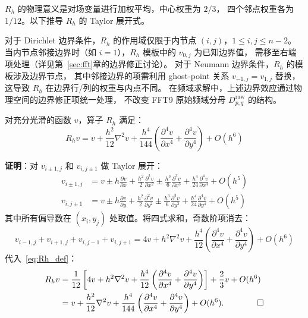 $R_h$ 的物理意义是对场变量进行加权平均，中心权重为 $2/3$，
四个邻点权重各为 $1/12$。以下推导 $R_h$ 的 Taylor 展开式。

\begin{remark}[$R_h$ 在边界附近的取值]
  \label{rem:Rh_boundary}
  对于 Dirichlet 边界条件，$R_h$ 的作用域仅限于内节点 $(i,j)$，$1 \leq i,j \leq n-2$。
  当内节点邻接边界时（如 $i=1$），$R_h$ 模板中的 $v_{0,j}$ 为已知边界值，
  需移至右端项处理（详见第~\ref{sec:fft}章的边界修正讨论）。
  对于 Neumann 边界条件，$R_h$ 的模板涉及边界节点，
  其中邻接边界的项需利用 ghost-point 关系 $v_{-1,j} = v_{1,j}$ 替换，
  这导致 $R_h$ 在边界行/列的权重与内点不同。
  在频域求解中，上述边界效应通过物理空间的边界修正项统一处理，
  不改变 FFT9 原始频域分母 $D_{p,q}^{\mathrm{raw}}$ 的结构。
\end{remark}

\begin{lemma}[$R_h$ 的 Taylor 展开]
  \label{lem:Rh_taylor}
  对充分光滑的函数 $v$，算子 $R_h$ 满足：
  \begin{equation}
    R_h v = v + \frac{h^2}{12}\nabla^2 v + \frac{h^4}{144}
    \left(\frac{\partial^4 v}{\partial x^4} + \frac{\partial^4 v}{\partial y^4}\right)
    + O(h^6)
    \label{eq:Rh_taylor}
  \end{equation}

  \textbf{证明}：对 $v_{i\pm1,j}$ 和 $v_{i,j\pm1}$ 做 Taylor 展开：
  \begin{align}
    v_{i\pm1,j} &= v \pm h\frac{\partial v}{\partial x} + \frac{h^2}{2}\frac{\partial^2 v}{\partial x^2}
    \pm \frac{h^3}{6}\frac{\partial^3 v}{\partial x^3} + \frac{h^4}{24}\frac{\partial^4 v}{\partial x^4} + O(h^5) \\
    v_{i,j\pm1} &= v \pm h\frac{\partial v}{\partial y} + \frac{h^2}{2}\frac{\partial^2 v}{\partial y^2}
    \pm \frac{h^3}{6}\frac{\partial^3 v}{\partial y^3} + \frac{h^4}{24}\frac{\partial^4 v}{\partial y^4} + O(h^5)
  \end{align}
  其中所有偏导数在 $(x_i, y_j)$ 处取值。将四式求和，奇数阶项消去：
  \begin{equation}
    v_{i-1,j} + v_{i+1,j} + v_{i,j-1} + v_{i,j+1}
    = 4v + h^2\nabla^2 v + \frac{h^4}{12}\left(\frac{\partial^4 v}{\partial x^4}
    + \frac{\partial^4 v}{\partial y^4}\right) + O(h^6)
  \end{equation}
  代入~\eqref{eq:Rh_def}：
  \begin{equation}
    \begin{aligned}
    R_h v
    &= \frac{1}{12}\left[4v + h^2\nabla^2 v
       + \frac{h^4}{12}\left(\frac{\partial^4 v}{\partial x^4}
       + \frac{\partial^4 v}{\partial y^4}\right)\right]
       + \frac{2}{3}v + O(h^6) \\
    &= v + \frac{h^2}{12}\nabla^2 v
       + \frac{h^4}{144}\left(\frac{\partial^4 v}{\partial x^4}
       + \frac{\partial^4 v}{\partial y^4}\right) + O(h^6). \qquad \qed
    \end{aligned}
  \end{equation}
\end{lemma}

